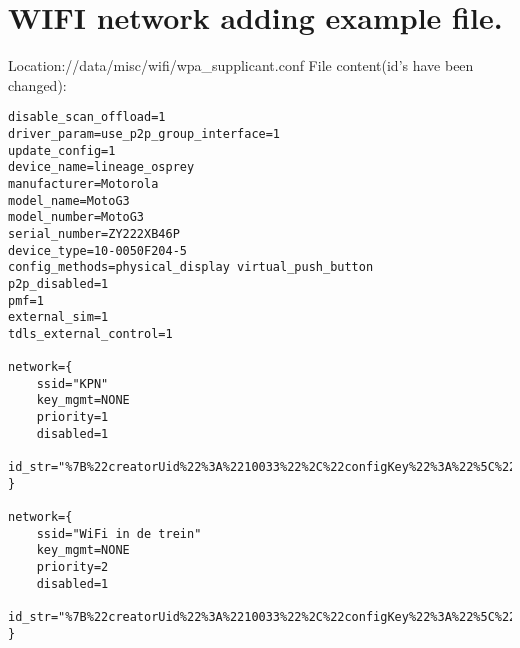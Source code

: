 \newpage
\section{WIFI network adding example file. }\label{app:D}
Location://data/misc/wifi/wpa\_supplicant.conf
\noindent File content(id's have been changed):

\begin{verbatim}
disable_scan_offload=1
driver_param=use_p2p_group_interface=1
update_config=1
device_name=lineage_osprey
manufacturer=Motorola
model_name=MotoG3
model_number=MotoG3
serial_number=ZY222XB46P
device_type=10-0050F204-5
config_methods=physical_display virtual_push_button
p2p_disabled=1
pmf=1
external_sim=1
tdls_external_control=1

network={
    ssid="KPN"
    key_mgmt=NONE
    priority=1
    disabled=1
    id_str="%7B%22creatorUid%22%3A%2210033%22%2C%22configKey%22%3A%22%5C%22KPN%5C%22NONE%22%7D"
}

network={
    ssid="WiFi in de trein"
    key_mgmt=NONE
    priority=2
    disabled=1
    id_str="%7B%22creatorUid%22%3A%2210033%22%2C%22configKey%22%3A%22%5C%22WiFi+in+de+trein%5C%22NONE%22%7D"
}
\end{verbatim}